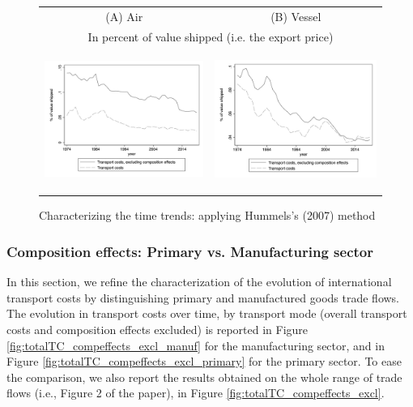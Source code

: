 \documentclass[11pt,twoside, authoryear]{elsarticle}
\begin{document}
\begin{figure}[htbp]
\caption{Characterizing the time trends: applying Hummels's (2007) method }
\label{fig:comp_effects_as_in_Hummels}
\begin{center}
\begin{tabular}{cc}
{\small (A) Air } & {\small (B) Vessel }\\
\multicolumn{2}{c}{{\small In percent of value shipped (i.e. the export price)}} \\
\includegraphics[width=2.5in, height=1.8in]{../figure5_comme_hummels.jpg}
& \includegraphics[width=2.5in,height=1.8in]{../figure6_comme_hummels.jpg} \\
\end{tabular}
\end{center}
\end{figure}


\subsubsection{Composition effects: Primary vs. Manufacturing sector}

In this section, we refine the characterization of the evolution of international transport costs by distinguishing primary and manufactured goods trade flows.
The evolution in transport costs over time, by transport mode (overall transport costs and composition effects excluded) is reported in Figure \ref{fig:totalTC_compeffects_excl_manuf} for the manufacturing sector, and in Figure \ref{fig:totalTC_compeffects_excl_primary} for the primary sector. To ease the comparison, we also report the results obtained on the whole range of trade flows (i.e., Figure 2 of the paper), in Figure \ref{fig:totalTC_compeffects_excl}.
\end{document}

